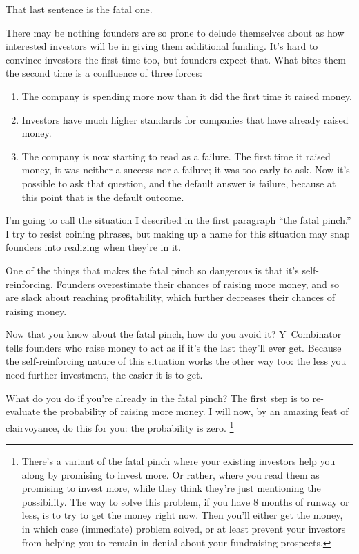 \documentclass[12pt]{book}
\begin{document}
That last sentence is the fatal one.

There may be nothing founders are so prone to delude themselves about as
how interested investors will be in giving them additional funding. It's
hard to convince investors the first time too, but founders expect that.
What bites them the second time is a confluence of three forces:

\begin{enumerate}
\def\labelenumi{\arabic{enumi}.}
\item
  The company is spending more now than it did the first time it raised
  money.
\item
  Investors have much higher standards for companies that have already
  raised money.
\item
  The company is now starting to read as a failure. The first time it
  raised money, it was neither a success nor a failure; it was too early
  to ask. Now it's possible to ask that question, and the default answer
  is failure, because at this point that is the default outcome.
\end{enumerate}

I'm going to call the situation I described in the first paragraph ``the
fatal pinch.'' I try to resist coining phrases, but making up a name for
this situation may snap founders into realizing when they're in it.

One of the things that makes the fatal pinch so dangerous is that it's
self-reinforcing. Founders overestimate their chances of raising more
money, and so are slack about reaching profitability, which further
decreases their chances of raising money.

Now that you know about the fatal pinch, how do you avoid it?
Y~Combinator tells founders who raise money to act as if it's the last
they'll ever get. Because the self-reinforcing nature of this situation
works the other way too: the less you need further investment, the
easier it is to get.

What do you do if you're already in the fatal pinch? The first step is
to re-evaluate the probability of raising more money. I will now, by an
amazing feat of clairvoyance, do this for you: the probability is zero.
\footnote{There's a variant of the fatal pinch where your existing
investors help you along by promising to invest more. Or rather, where
you read them as promising to invest more, while they think they're just
mentioning the possibility. The way to solve this problem, if you have 8
months of runway or less, is to try to get the money right now. Then
you'll either get the money, in which case (immediate) problem solved,
or at least prevent your investors from helping you to remain in denial
about your fundraising prospects.}
\end{document}
